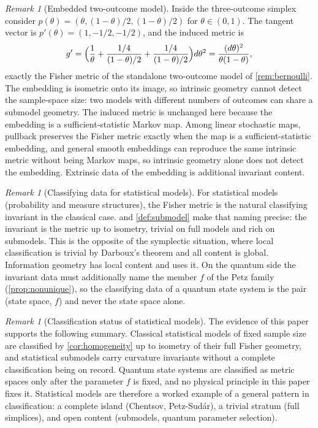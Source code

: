 \documentclass[11pt,letterpaper]{article}
\theoremstyle{definition}
\theoremstyle{remark}
\newtheorem{remark}[theorem]{Remark}
\begin{document}
\begin{remark}[Embedded two-outcome model]
\label{rem:embedded}
Inside the three-outcome simplex consider $p(\theta) = (\theta, (1-\theta)/2, (1-\theta)/2)$ for $\theta \in (0, 1)$. The tangent vector is $p'(\theta) = (1, -1/2, -1/2)$, and the induced metric is
\begin{equation}
g' = \Bigl( \frac{1}{\theta} + \frac{1/4}{(1-\theta)/2} + \frac{1/4}{(1-\theta)/2} \Bigr) d\theta^2
= \frac{(d\theta)^2}{\theta(1-\theta)},
\end{equation}
exactly the Fisher metric of the standalone two-outcome model of \cref{rem:bernoulli}. The embedding is isometric onto its image, so intrinsic geometry cannot detect the sample-space size: two models with different numbers of outcomes can share a submodel geometry. The induced metric is unchanged here because the embedding is a sufficient-statistic Markov map. Among linear stochastic maps, pullback preserves the Fisher metric exactly when the map is a sufficient-statistic embedding, and general smooth embeddings can reproduce the same intrinsic metric without being Markov maps, so intrinsic geometry alone does not detect the embedding. Extrinsic data of the embedding is additional invariant content.
\end{remark}

\begin{remark}[Classifying data for statistical models]
\label{rem:family-v}
For statistical models (probability and measure structures), the Fisher metric is the natural classifying invariant in the classical case.  and \cref{def:submodel} make that naming precise: the invariant is the metric up to isometry, trivial on full models and rich on submodels. This is the opposite of the symplectic situation, where local classification is trivial by Darboux's theorem and all content is global. Information geometry has local content and uses it. On the quantum side the invariant data must additionally name the member $f$ of the Petz family (\cref{prop:nonunique}), so the classifying data of a quantum state system is the pair (state space, $f$) and never the state space alone.
\end{remark}

\begin{remark}[Classification status of statistical models]
\label{rem:status}
The evidence of this paper supports the following summary. Classical statistical models of fixed sample size are classified by \cref{cor:homogeneity} up to isometry of their full Fisher geometry, and statistical submodels carry curvature invariants without a complete classification being on record. Quantum state systems are classified as metric spaces only after the parameter $f$ is fixed, and no physical principle in this paper fixes it. Statistical models are therefore a worked example of a general pattern in classification: a complete island (Chentsov, Petz-Sud\'ar), a trivial stratum (full simplices), and open content (submodels, quantum parameter selection).
\end{remark}
\end{document}
